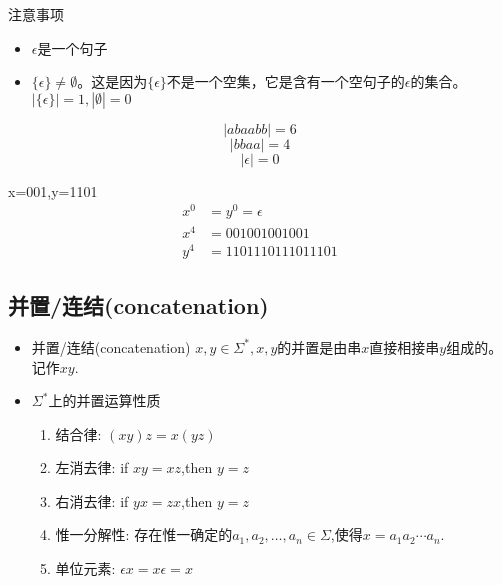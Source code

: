 \begin{note} 注意事项
	\begin{itemize}
		\item $\epsilon$是一个句子
		\item $\{\epsilon\}\ne \emptyset$。这是因为$\{\epsilon\}$不是一个空集，它是含有一个空句子的$\epsilon$的集合。$|\{\epsilon\}|=1,|\emptyset|=0$
	\end{itemize}
\end{note}

\begin{example}
	$$|abaabb|=6$$
	$$|bbaa|=4$$
	$$|\epsilon|=0$$
\end{example}

\begin{example}
	x=001,y=1101
	\begin{align*}
	x^0 &= y^0 = \epsilon \\
	x^4 &= 001001001001 \\
	y^4 &= 1101110111011101
	\end{align*}
\end{example}

\subsection{并置/连结(concatenation)}
\begin{itemize}
	\item 并置/连结(concatenation)
	\subitem{-} $x,y\in \Sigma^{\ast},x,y$的并置是由串$x$直接相接串$y$组成的。记作$xy$.
	\item $\Sigma^{\ast}$上的并置运算性质
	\begin{enumerate}
		\item 结合律: $(xy)z=x(yz)$
		\item 左消去律: if $xy=xz$,then $y=z$
		\item 右消去律: if $yx=zx$,then $y=z$
		\item 惟一分解性: 存在惟一确定的$a_1,a_2,\dots,a_n \in \Sigma$,使得$x=a_1a_2\cdots a_n$.
		\item 单位元素: $\epsilon x=x\epsilon=x$
	\end{enumerate} 
\end{itemize}

